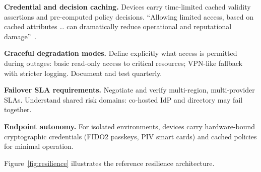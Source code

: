 \documentclass[sigconf,nonacm]{acmart}
\begin{document}
\textbf{Credential and decision caching.}  Devices carry time-limited
cached validity assertions and pre-computed policy decisions.  ``Allowing
limited access, based on cached attributes \ldots{} can dramatically
reduce operational and reputational damage''~\cite{hackernews2024}.

\textbf{Graceful degradation modes.}  Define explicitly what access is
permitted during outages: basic read-only access to critical resources;
VPN-like fallback with stricter logging.  Document and test quarterly.

\textbf{Failover SLA requirements.}  Negotiate and verify multi-region,
multi-provider SLAs.  Understand shared risk domains: co-hosted IdP
and directory may fail together.

\textbf{Endpoint autonomy.}  For isolated environments, devices carry
hardware-bound cryptographic credentials (FIDO2 passkeys, PIV smart
cards) and cached policies for minimal operation.

Figure~\ref{fig:resilience} illustrates the reference resilience
architecture.
\end{document}
